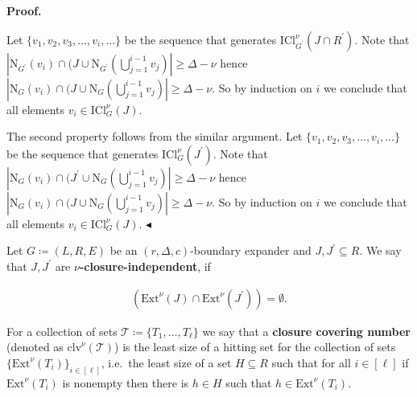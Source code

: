 



\par\medskip\noindent\textbf{Proof.}\par




Let $\{v_{1},v_{2},v_{3},\dots,v_{i},\dots\}$ be the sequence that generates $\mathrm{ICl}_{G^{\prime}}^{\nu}\left(J\cap R^{\prime}\right)$. Note that $|\mathrm{N}_{G^{\prime}}\left(v_{i}\right)\cap(J\cup\mathrm{N}_{G^{\prime}}%
\left(\bigcup\limits_{j=1}^{i-1}v_{j}\right)|\geq\Delta-\nu$ hence $|\mathrm{N}_{G}\left(v_{i}\right)\cap(J\cup\mathrm{N}_{G}\left(\bigcup\limits_%
{j=1}^{i-1}v_{j}\right)|\geq\Delta-\nu$. So by induction on $i$ we conclude that all elements $v_{i}\in\mathrm{ICl}_{G}^{\nu}\left(J\right)$.\par




The second property follows from the similar argument. Let $\{v_{1},v_{2},v_{3},\dots,v_{i},\dots\}$ be
the sequence that generates $\mathrm{ICl}_{G}^{\nu}\left(J^{\prime}\right)$. Note that $|\mathrm{N}_{G}\left(v_{i}\right)\cap(J^{\prime}\cup\mathrm{N}_{G}\left(%
\bigcup\limits_{j=1}^{i-1}v_{j}\right)|\geq\Delta-\nu$ hence $|\mathrm{N}_{G}\left(v_{i}\right)\cap(J\cup\mathrm{N}_{G}\left(\bigcup\limits_%
{j=1}^{i-1}v_{j}\right)|\geq\Delta-\nu$. So by induction on $i$ we conclude
that all elements $v_{i}\in\mathrm{ICl}_{G}^{\nu}\left(J\right)$.
$\blacktriangleleft$\par




Let $G\coloneqq(L,R,E)$ be an $(r,\Delta,c)$-boundary expander and $J,J^{\prime}\subseteq R$. We say that
$J,J^{\prime}$ are $\nu$\textbf{-closure-independent}, if\par


\[\begin{gathered}
\left(\mathrm{Ext}^{\nu}\left(J\right)\cap\mathrm{Ext}^{\nu}\left(J^{\prime}%
\right)\right)=\emptyset.
\end{gathered}\]


For a collection of sets $\mathcal{T}\coloneqq\{T_{1},\dots,T_{\ell}\}$ we say that a
\textbf{closure covering number} (denoted as $\mathrm{clv}^{\nu}\left(\mathcal{T}\right)$) is the least size of a hitting
set for the collection of sets $\{\mathrm{Ext}^{\nu}\left(T_{i}\right)\}_{i\in[\ell]}$, i.e. the least size of a set $H\subseteq R$ such that for all $i\in[\ell]$ if $\mathrm{Ext}^{\nu}\left(T_{i}\right)$ is nonempty then there is $h\in H$
such that $h\in\mathrm{Ext}^{\nu}\left(T_{i}\right)$.\par






